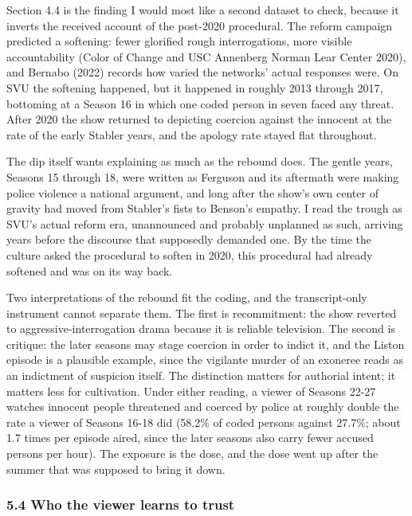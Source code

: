 \documentclass[
]{article}
\begin{document}
Section 4.4 is the finding I would most like a second dataset to check,
because it inverts the received account of the post-2020 procedural. The
reform campaign predicted a softening: fewer glorified rough
interrogations, more visible accountability (Color of Change and USC
Annenberg Norman Lear Center 2020), and Bernabo (2022) records how
varied the networks' actual responses were. On SVU the softening
happened, but it happened in roughly 2013 through 2017, bottoming at a
Season 16 in which one coded person in seven faced any threat. After
2020 the show returned to depicting coercion against the innocent at the
rate of the early Stabler years, and the apology rate stayed flat
throughout.

The dip itself wants explaining as much as the rebound does. The gentle
years, Seasons 15 through 18, were written as Ferguson and its aftermath
were making police violence a national argument, and long after the
show's own center of gravity had moved from Stabler's fists to Benson's
empathy. I read the trough as SVU's actual reform era, unannounced and
probably unplanned as such, arriving years before the discourse that
supposedly demanded one. By the time the culture asked the procedural to
soften in 2020, this procedural had already softened and was on its way
back.

Two interpretations of the rebound fit the coding, and the
transcript-only instrument cannot separate them. The first is
recommitment: the show reverted to aggressive-interrogation drama
because it is reliable television. The second is critique: the later
seasons may stage coercion in order to indict it, and the Liston episode
is a plausible example, since the vigilante murder of an exoneree reads
as an indictment of suspicion itself. The distinction matters for
authorial intent; it matters less for cultivation. Under either reading,
a viewer of Seasons 22-27 watches innocent people threatened and coerced
by police at roughly double the rate a viewer of Seasons 16-18 did
(58.2\% of coded persons against 27.7\%; about 1.7 times per episode
aired, since the later seasons also carry fewer accused persons per
hour). The exposure is the dose, and the dose went up after the summer
that was supposed to bring it down.

\subsubsection{5.4 Who the viewer learns to
trust}\label{who-the-viewer-learns-to-trust}
\end{document}
